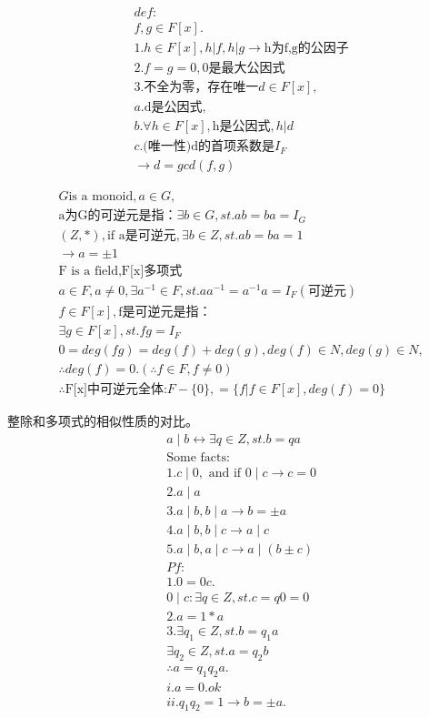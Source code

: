 \documentclass[12pt, a4paper]{article}  %
\begin{document}
\begin{align}
    &def:\\
    &f,g\in F[x].\\
    &1. h\in F[x],h|f,h|g\rightarrow \text{h为f,g的公因子}\\
    &2.f=g=0,\text{0是最大公因式}\\
    &3.\text{不全为零，存在唯一}d\in F[x],\\
    &a.\text{d是公因式},\\
    &b.\forall h\in F[x],\text{h是公因式},h|d\\
    &c.\text{(唯一性)d的首项系数是}I_F\\
    &\rightarrow d=gcd(f,g)
\end{align}


\begin{align}
    &G\text{is a monoid},a\in G,\\
    &\text{a为G的可逆元是指：}\exists b\in G,st. ab=ba=I_G\\
    &(Z,*),\text{if a是可逆元},\exists b\in Z,st. ab=ba=1\\
    &\rightarrow a=\pm 1\\
    &\text{F is a field,F[x]多项式}\\
    &a\in F,a\neq 0,\exists a^{-1}\in F,st. aa^{-1}=a^{-1}a=I_F(\text{可逆元})\\
    &f\in F[x],\text{f是可逆元是指：}\\
    &\exists g\in F[x],st. fg=I_F\\
    &0=deg(fg)=deg(f)+deg(g),deg(f)\in N,deg(g)\in N,\\
    &\therefore deg(f)=0.(\therefore f\in F,f\neq 0)\\
    &\therefore \text{F[x]中可逆元全体:}F-\{0\},=\{f |f\in F[x],deg(f)=0\}
\end{align}

整除和多项式的相似性质的对比。
\begin{align}
    &a \mid b\leftrightarrow \exists q\in Z,st. b=qa\\
    &\text{Some facts:}\\
    &1.c\mid 0,\text{ and if }0\mid c\rightarrow c=0\\
    &2.a\mid a\\
    &3.a\mid b,b\mid a\rightarrow b=\pm a\\
    &4.a\mid b,b\mid c\rightarrow a\mid c\\
    &5.a\mid b,a\mid c\rightarrow a\mid (b\pm c)\\
    &Pf:\\
    &1.0=0c.\\
    &0\mid c:\exists q\in Z,st. c=q0=0\\
    &2.a=1*a\\
    &3.\exists q_1\in Z,st. b=q_1a\\
    &\exists q_2\in Z,st. a=q_2b\\
    &\therefore a=q_1q_2a.\\
    &i.a=0.ok\\
    &ii. q_1q_2=1\rightarrow b=\pm a.\\
\end{align}
\end{document}
